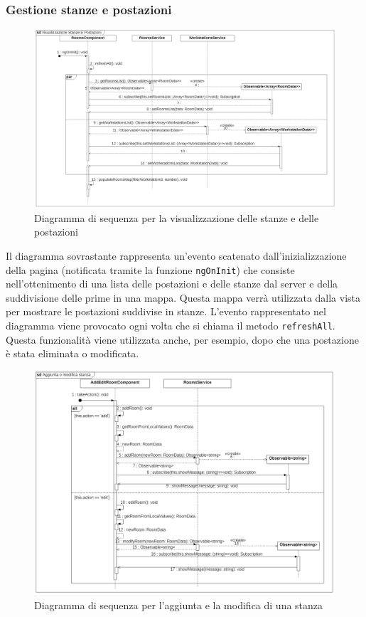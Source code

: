 \subsubsection{Gestione stanze e postazioni}
\begin{figure}[H]
	\centering
	\includegraphics[width=18cm]{res/images/webapp-visualStanzePostazioni-diagrammaSequenza.png}
	\caption{Diagramma di sequenza per la visualizzazione delle stanze e delle postazioni}
	\label{fig:DiagrammaSequenzaStanzePostazioni1}
\end{figure}
Il diagramma sovrastante rappresenta un'evento scatenato dall'inizializzazione della pagina (notificata tramite la funzione \texttt{ngOnInit}) che consiste nell'ottenimento di una lista delle postazioni e delle stanze dal server e della suddivisione delle prime in una mappa. Questa mappa verrà utilizzata dalla vista per mostrare le postazioni suddivise in stanze. L'evento rappresentato nel diagramma viene provocato ogni volta che si chiama il metodo \texttt{refreshAll}. Questa funzionalità viene utilizzata anche, per esempio, dopo che una postazione è stata eliminata o modificata.
\begin{figure}[H]
	\centering
	\includegraphics[width=18cm]{res/images/webapp-addEditStanzePostazioni-diagrammaSequenza.png}
	\caption{Diagramma di sequenza per l'aggiunta e la modifica di una stanza}
	\label{fig:DiagrammaSequenzaStanzePostazioni2}
\end{figure}
